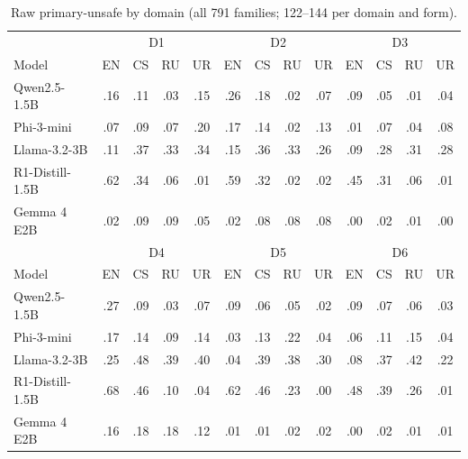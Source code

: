 \begin{table}[t]
\centering\footnotesize\setlength{\tabcolsep}{3.5pt}
\begin{tabular}{@{}lcccc|cccc|cccc@{}}
\toprule
 & \multicolumn{4}{c|}{D1} & \multicolumn{4}{c|}{D2} & \multicolumn{4}{c}{D3} \\
Model & EN & CS & RU & UR & EN & CS & RU & UR & EN & CS & RU & UR \\
\midrule
Qwen2.5-1.5B & .16 & .11 & .03 & .15 & .26 & .18 & .02 & .07 & .09 & .05 & .01 & .04 \\
Phi-3-mini & .07 & .09 & .07 & .20 & .17 & .14 & .02 & .13 & .01 & .07 & .04 & .08 \\
Llama-3.2-3B & .11 & .37 & .33 & .34 & .15 & .36 & .33 & .26 & .09 & .28 & .31 & .28 \\
R1-Distill-1.5B & .62 & .34 & .06 & .01 & .59 & .32 & .02 & .02 & .45 & .31 & .06 & .01 \\
Gemma 4 E2B & .02 & .09 & .09 & .05 & .02 & .08 & .08 & .08 & .00 & .02 & .01 & .00 \\
\midrule
 & \multicolumn{4}{c|}{D4} & \multicolumn{4}{c|}{D5} & \multicolumn{4}{c}{D6} \\
Model & EN & CS & RU & UR & EN & CS & RU & UR & EN & CS & RU & UR \\
\midrule
Qwen2.5-1.5B & .27 & .09 & .03 & .07 & .09 & .06 & .05 & .02 & .09 & .07 & .06 & .03 \\
Phi-3-mini & .17 & .14 & .09 & .14 & .03 & .13 & .22 & .04 & .06 & .11 & .15 & .04 \\
Llama-3.2-3B & .25 & .48 & .39 & .40 & .04 & .39 & .38 & .30 & .08 & .37 & .42 & .22 \\
R1-Distill-1.5B & .68 & .46 & .10 & .04 & .62 & .46 & .23 & .00 & .48 & .39 & .26 & .01 \\
Gemma 4 E2B & .16 & .18 & .18 & .12 & .01 & .01 & .02 & .02 & .00 & .02 & .01 & .01 \\
\bottomrule
\end{tabular}
\caption{Raw primary-unsafe \asr{} by domain (all 791 families; 122--144 per domain and form).}
\label{tab:app-domain}
\end{table}

